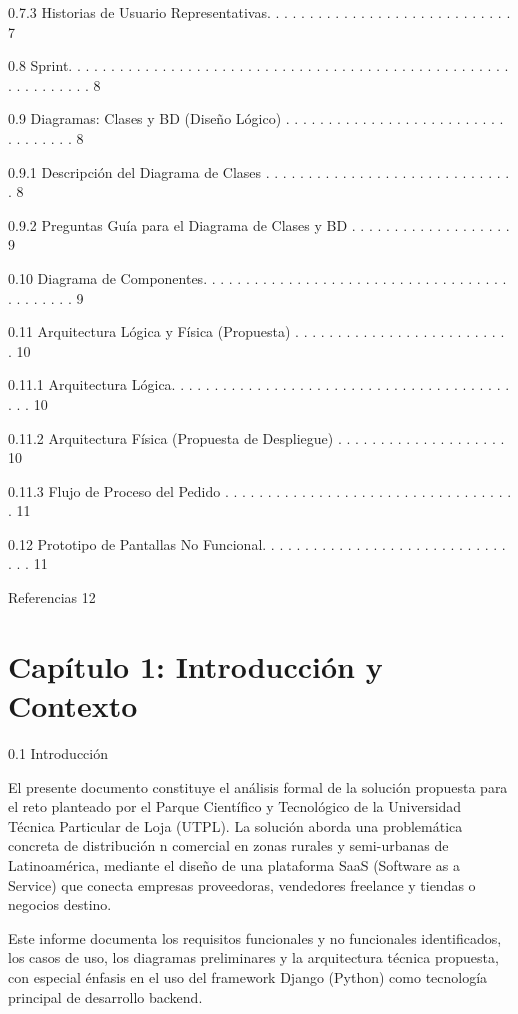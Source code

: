 \documentclass[
]{article}
\begin{document}
0.7.3 Historias de Usuario Representativas. . . . . . . . . . . . . . .
. . . . . . . . . . . . . . 7

0.8 Sprint. . . . . . . . . . . . . . . . . . . . . . . . . . . . . . .
. . . . . . . . . . . . . . . . . . . . . . . . . . . . . . . 8

0.9 Diagramas: Clases y BD (Diseño Lógico) . . . . . . . . . . . . . . .
. . . . . . . . . . . . . . . . . . . 8

0.9.1 Descripción del Diagrama de Clases . . . . . . . . . . . . . . . .
. . . . . . . . . . . . . . 8

0.9.2 Preguntas Guía para el Diagrama de Clases y BD . . . . . . . . . .
. . . . . . . . . 9

0.10 Diagrama de Componentes. . . . . . . . . . . . . . . . . . . . . .
. . . . . . . . . . . . . . . . . . . . . . 9

0.11 Arquitectura Lógica y Física (Propuesta) . . . . . . . . . . . . .
. . . . . . . . . . . . . 10

0.11.1 Arquitectura Lógica. . . . . . . . . . . . . . . . . . . . . . .
. . . . . . . . . . . . . . . . . . . . 10

0.11.2 Arquitectura Física (Propuesta de Despliegue) . . . . . . . . . .
. . . . . . . . . . 10

0.11.3 Flujo de Proceso del Pedido . . . . . . . . . . . . . . . . . . .
. . . . . . . . . . . . . . . . 11

0.12 Prototipo de Pantallas No Funcional. . . . . . . . . . . . . . . .
. . . . . . . . . . . . . . . . 11

Referencias 12

\section{Capítulo 1: Introducción y
Contexto}\label{capuxedtulo-1-introducciuxf3n-y-contexto}

0.1 Introducción

El presente documento constituye el análisis formal de la solución
propuesta para el reto planteado por el Parque Científico y Tecnológico
de la Universidad Técnica Particular de Loja (UTPL). La solución aborda
una problemática concreta de distribución n comercial en zonas rurales y
semi-urbanas de Latinoamérica, mediante el diseño de una plataforma SaaS
(Software as a Service) que conecta empresas proveedoras, vendedores
freelance y tiendas o negocios destino.

Este informe documenta los requisitos funcionales y no funcionales
identificados, los casos de uso, los diagramas preliminares y la
arquitectura técnica propuesta, con especial énfasis en el uso del
framework Django (Python) como tecnología principal de desarrollo
backend.
\end{document}
